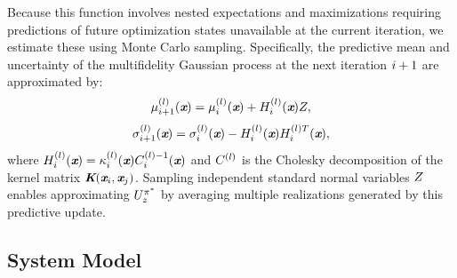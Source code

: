 Because this function involves nested expectations and maximizations requiring predictions of future optimization states unavailable at the current iteration, we estimate these using Monte Carlo sampling. Specifically, the predictive mean and uncertainty of the multifidelity Gaussian process at the next iteration \(i+1\) are approximated by:
\begin{equation} \label{e:MCmu}
	\mu^{(l)}_{i+1}(\textbf{\em x}) = \mu^{(l)}_{i}(\textbf{\em x}) + H^{(l)}_{i}(\textbf{\em x}) Z,
\end{equation}
\begin{equation} \label{e:MCsigma}
	\sigma^{(l)}_{i+1}(\textbf{\em x}) = \sigma^{(l)}_{i}(\textbf{\em x}) - H^{(l)}_{i}(\textbf{\em x}) H^{(l)T}_{i}(\textbf{\em x}),
\end{equation}
where \(H^{(l)}_{i}(\textbf{\em x}) = \kappa^{(l)}_{i}(\textbf{\em x}) C^{(l)-1}_{i}(\textbf{\em x})\) and \(C^{(l)}\) is the Cholesky decomposition of the kernel matrix \(\textbf{\em K}(\textbf{\em x}_i, \textbf{\em x}_j)\). Sampling independent standard normal variables \(Z\) enables approximating \(U^{\pi^*}_{z}\) by averaging multiple realizations generated by this predictive update.

\subsection{System Model}


